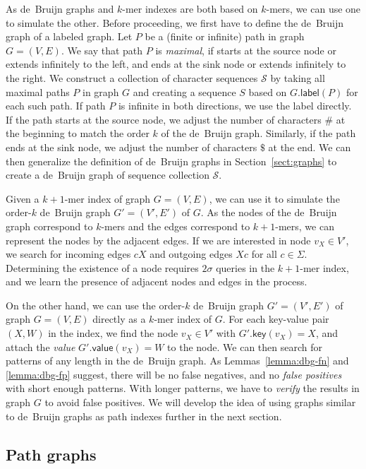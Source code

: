 \documentclass[a4paper,UKenglish]{lipics-v2016}
\newcommand{\glabel}{\ensuremath{\mathsf{label}}}
\newcommand{\gkey}{\ensuremath{\mathsf{key}}}
\newcommand{\gvalue}{\ensuremath{\mathsf{value}}}
\newcommand{\kmer}[1]{$#1$\nobreakdash-mer}
\newcommand{\orderk}[1]{order\nobreakdash-$#1$}
\begin{document}
As de~Bruijn graphs and \kmer{k} indexes are both based on \kmer{k}s, we can use one to simulate the other. Before proceeding, we first have to define the de~Bruijn graph of a labeled graph. Let $P$ be a (finite or infinite) path in graph $G = (V, E)$. We say that path $P$ is \emph{maximal}, if starts at the source node or extends infinitely to the left, and ends at the sink node or extends infinitely to the right. We construct a collection of character sequences $\mathcal{S}$ by taking all maximal paths $P$ in graph $G$ and creating a sequence $S$ based on $G.\glabel(P)$ for each such path. If path $P$ is infinite in both directions, we use the label directly. If the path starts at the source node, we adjust the number of characters $\#$ at the beginning to match the order $k$ of the de~Bruijn graph. Similarly, if the path ends at the sink node, we adjust the number of characters $\$$ at the end. We can then generalize the definition of de~Bruijn graphs in Section~\ref{sect:graphs} to create a de~Bruijn graph of sequence collection $\mathcal{S}$.

Given a \kmer{k+1} index of graph $G = (V, E)$, we can use it to simulate the \orderk{k} de~Bruijn graph $G' = (V', E')$ of $G$. As the nodes of the de~Bruijn graph correspond to \kmer{k}s and the edges correspond to \kmer{k+1}s, we can represent the nodes by the adjacent edges. If we are interested in node $v_{X} \in V'$, we search for incoming edges $cX$ and outgoing edges $Xc$ for all $c \in \Sigma$. Determining the existence of a node requires $2 \sigma$ queries in the \kmer{k+1} index, and we learn the presence of adjacent nodes and edges in the process.

On the other hand, we can use the \orderk{k} de~Bruijn graph $G' = (V', E')$ of graph $G = (V, E)$ directly as a \kmer{k} index of $G$. For each key-value pair $(X, W)$ in the index, we find the node $v_{X} \in V'$ with $G'.\gkey(v_{X}) = X$, and attach the \emph{value} $G'.\gvalue(v_{X}) = W$ to the node. We can then search for patterns of any length in the de~Bruijn graph. As Lemmas~\ref{lemma:dbg-fn} and \ref{lemma:dbg-fp} suggest, there will be no false negatives, and no \emph{false positives} with short enough patterns. With longer patterns, we have to \emph{verify} the results in graph $G$ to avoid false positives. We will develop the idea of using graphs similar to de~Bruijn graphs as path indexes further in the next section.

\subsection{Path graphs}
\end{document}
